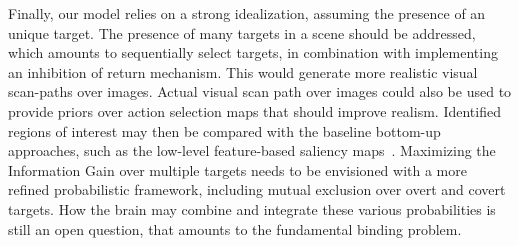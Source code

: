 Finally, our model relies on a strong idealization, assuming the presence of an unique target. The presence of many targets in a scene should be addressed, which amounts to sequentially select targets, in combination with implementing an inhibition of return mechanism. 
This would generate more realistic visual scan-paths over images. %
Actual visual scan path over images could also be used to provide priors over action selection maps that should improve realism.  %
Identified regions of interest may then be compared with the baseline bottom-up approaches, such as the low-level feature-based saliency maps~\cite{Itti01}. 
Maximizing the Information Gain over multiple targets needs to be envisioned with a more refined probabilistic framework, including mutual exclusion over overt and covert targets. How the brain may combine and integrate these various probabilities is still an open question, that amounts to the fundamental binding problem. %

